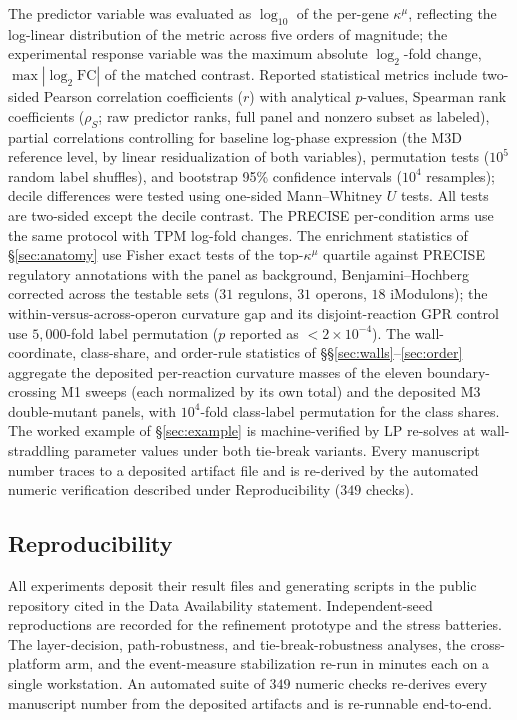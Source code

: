 \documentclass[11pt,a4paper]{article}
\theoremstyle{plain}
\theoremstyle{definition}
\theoremstyle{remark}
\newcommand{\kmu}{\kappa^{\mu}}
\begin{document}
The predictor variable was evaluated as $\log_{10}$ of the per-gene
$\kmu$, reflecting the log-linear distribution of the metric across
five orders of magnitude; the experimental response variable was the
maximum absolute $\log_2$-fold change, $\max|\log_2 \mathrm{FC}|$ of
the matched contrast. Reported statistical metrics include two-sided
Pearson correlation coefficients ($r$) with analytical $p$-values,
Spearman rank coefficients ($\rho_S$; raw predictor ranks, full
panel and nonzero subset as labeled), partial correlations
controlling for baseline log-phase expression (the M3D reference
level, by linear residualization of both variables), permutation
tests ($10^5$ random label shuffles), and bootstrap 95\% confidence
intervals ($10^4$ resamples); decile differences were tested using
one-sided Mann--Whitney $U$ tests. All tests are two-sided except
the decile contrast. The PRECISE per-condition arms use the same
protocol with TPM log-fold changes. The enrichment statistics of
\S\ref{sec:anatomy} use Fisher exact tests of the top-$\kmu$
quartile against PRECISE regulatory annotations with the panel as
background, Benjamini--Hochberg corrected across the testable sets
($31$ regulons, $31$ operons, $18$ iModulons); the
within-versus-across-operon curvature gap and its disjoint-reaction
GPR control use $5{,}000$-fold label permutation ($p$ reported as
$< 2 \times 10^{-4}$). The wall-coordinate, class-share, and
order-rule statistics of \S\S\ref{sec:walls}--\ref{sec:order}
aggregate the deposited per-reaction curvature masses of the eleven
boundary-crossing M1 sweeps (each normalized by its own total) and
the deposited M3 double-mutant panels, with $10^4$-fold class-label
permutation for the class shares. The worked example of
\S\ref{sec:example} is machine-verified by LP re-solves at
wall-straddling parameter values under both tie-break variants.
Every manuscript number traces
to a deposited artifact file and is re-derived by the automated
numeric verification described under Reproducibility
($349$ checks).

\subsection{Reproducibility}

All experiments deposit their result files and generating
scripts in the public repository cited in the Data Availability
statement. Independent-seed reproductions are recorded for the
refinement prototype and the stress batteries. The layer-decision,
path-robustness, and tie-break-robustness analyses, the cross-platform
arm, and the event-measure stabilization re-run in minutes each on a
single workstation. An automated suite of $349$ numeric checks
re-derives every manuscript number from the deposited artifacts and
is re-runnable end-to-end.
\end{document}
